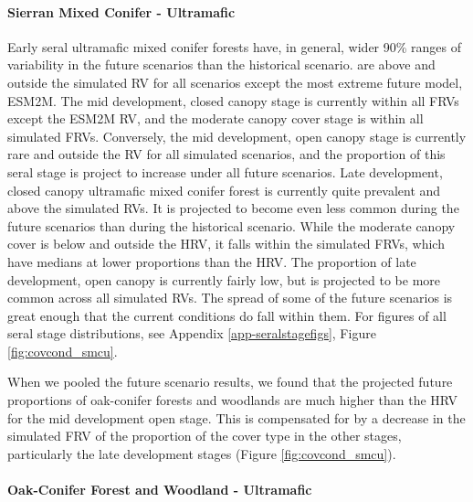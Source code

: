 \documentclass[12pt]{article}
\begin{document}
\begin{spacing}{1}
\paragraph{Sierran Mixed Conifer - Ultramafic} Early seral ultramafic mixed conifer forests have, in general, wider 90\% ranges of variability in the future scenarios than the historical scenario. are above and outside the simulated RV for all scenarios except the most extreme future model, ESM2M. The mid development, closed canopy stage is currently within all FRVs except the ESM2M RV, and the moderate canopy cover stage is within all simulated FRVs. Conversely, the mid development, open canopy stage is currently rare and outside the RV for all simulated scenarios, and the proportion of this seral stage is project to increase under all future scenarios. Late development, closed canopy ultramafic mixed conifer forest is currently quite prevalent and above the simulated RVs. It is projected to become even less common during the future scenarios than during the historical scenario. While the moderate canopy cover is below and outside the HRV, it falls within the simulated FRVs, which have medians at lower proportions than the HRV. The proportion of late development, open canopy is currently fairly low, but is projected to be more common across all simulated RVs. The spread of some of the future scenarios is great enough that the current conditions do fall within them. For figures of all seral stage distributions, see Appendix \ref{app-seralstagefigs}, Figure \ref{fig:covcond_smcu}.

When we pooled the future scenario results, we found that the projected future proportions of oak-conifer forests and woodlands are much higher than the HRV for the mid development open stage. This is compensated for by a decrease in the simulated FRV of the proportion of the cover type in the other stages, particularly the late development stages (Figure \ref{fig:covcond_smcu}).

\paragraph{Oak-Conifer Forest and Woodland - Ultramafic}





\end{spacing}
\end{document}
